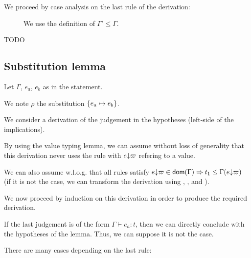 \documentclass[a4paper]{article}
\theoremstyle{definition}
\begin{document}
        We proceed by case analysis on the last rule of the derivation:
        
        \begin{description}
          \item[] We use the definition of $\Gamma' \leq \Gamma$.
          \item[TODO] 
        \end{description}

        \subsection{Substitution lemma}

        Let $\Gamma$, $e_a$, $e_b$ as in the statement.

        We note $\rho$ the substitution $\{e_a \mapsto e_b\}$.

        We consider a derivation of the judgement in the hypotheses (left-side of the implications).

        By using the value typing lemma, we can assume without loss of generality that this derivation
        never uses the rule  with $e{\downarrow}\varpi$ refering to a value.

        We can also assume w.l.o.g. that all rules  satisfy
        $e{\downarrow}\varpi \in\textsf{dom}(\Gamma) \Rightarrow t_1 \leq \Gamma(e{\downarrow}\varpi)$ (if it is not the case,
        we can transform the derivation using , ,  and ).

        We now proceed by induction on this derivation in order to produce the required derivation.
        
        If the last judgement is of the form $\Gamma \vdash e_a: t$, then we can directly conclude with the hypotheses of the lemma.
        Thus, we can suppose it is not the case.

        There are many cases depending on the last rule:
\end{document}
